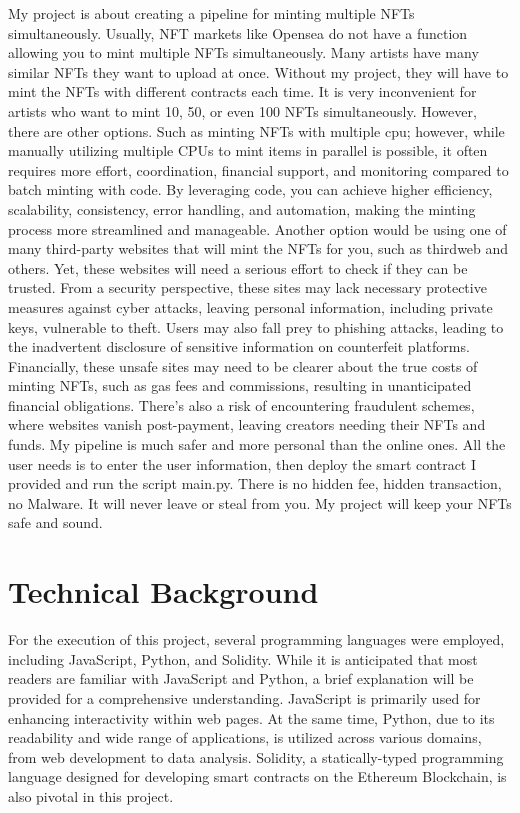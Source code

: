\documentclass[10pt,twocolumn]{article}
\begin{document}
My project is about creating a pipeline for minting multiple NFTs simultaneously. Usually, NFT markets like Opensea do not have a function allowing you to mint multiple NFTs simultaneously. Many artists have many similar NFTs they want to upload at once. Without my project, they will have to mint the NFTs with different contracts each time. It is very inconvenient for artists who want to mint 10, 50, or even 100 NFTs simultaneously.  However, there are other options. Such as minting NFTs with multiple cpu; however, while manually utilizing multiple CPUs to mint items in parallel is possible, it often requires more effort, coordination, financial support, and monitoring compared to batch minting with code. By leveraging code, you can achieve higher efficiency, scalability, consistency, error handling, and automation, making the minting process more streamlined and manageable. Another option would be using one of many third-party websites that will mint the NFTs for you, such as thirdweb and others. Yet, these websites will need a serious effort to check if they can be trusted. From a security perspective, these sites may lack necessary protective measures against cyber attacks, leaving personal information, including private keys, vulnerable to theft. Users may also fall prey to phishing attacks, leading to the inadvertent disclosure of sensitive information on counterfeit platforms. Financially, these unsafe sites may need to be clearer about the true costs of minting NFTs, such as gas fees and commissions, resulting in unanticipated financial obligations. There's also a risk of encountering fraudulent schemes, where websites vanish post-payment, leaving creators needing their NFTs and funds. My pipeline is much safer and more personal than the online ones.  All the user needs is to enter the user information, then deploy the smart contract I provided and run the script main.py. There is no hidden fee, hidden transaction, no Malware. It will never leave or steal from you. My project will keep your NFTs safe and sound.  
\section{Technical Background}
For the execution of this project, several programming languages were employed, including JavaScript, Python, and Solidity. While it is anticipated that most readers are familiar with JavaScript and Python, a brief explanation will be provided for a comprehensive understanding. JavaScript is primarily used for enhancing interactivity within web pages. At the same time, Python, due to its readability and wide range of applications, is utilized across various domains, from web development to data analysis. Solidity, a statically-typed programming language designed for developing smart contracts on the Ethereum Blockchain, is also pivotal in this project.
\end{document}
